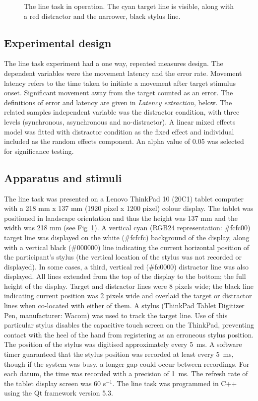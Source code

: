 \documentclass[10pt,letterpaper]{article}
\begin{document}
\begin{figure}[htb!]
\centering
\caption[The line task.]
{The line task in operation. The cyan
  target line is visible, along with a red distractor and the
  narrower, black stylus line.}
\label{linetask}
\end{figure}

\subsection*{Experimental design}
The line task experiment had a one way, repeated measures design. The
dependent variables were the movement latency and the error
rate. Movement latency refers to the time taken to initiate a movement
after target stimulus onset. Significant movement away from the target
counted as an error. The definitions of error and latency are given in
\emph{Latency extraction}, below. The related samples independent
variable was the distractor condition, with three levels (synchronous,
asynchronous and no-distractor). A linear mixed effects model was
fitted with distractor condition as the fixed effect and individual
included as the random effects component. An alpha value of 0.05 was
selected for significance testing.

\subsection*{Apparatus and stimuli}
The line task was presented on a Lenovo ThinkPad 10 (20C1) tablet
computer with a 218 mm x 137 mm (1920 pixel x 1200 pixel) colour
display. The tablet was positioned in landscape orientation and thus
the height was 137 mm and the width was 218 mm (see
Fig~\ref{linetask}). A vertical cyan (RGB24 representation: \#fcfc00)
target line was displayed on the white (\#fcfcfc) background of the
display, along with a vertical black (\#000000) line indicating the
current horizontal position of the participant's stylus (the vertical
location of the stylus was not recorded or displayed). In some cases,
a third, vertical red (\#fc0000) distractor line was also
displayed. All lines extended from the top of the display to the
bottom; the full height of the display. Target and distractor lines
were 8 pixels wide; the black line indicating current position was 2
pixels wide and overlaid the target or distractor lines when
co-located with either of them. A stylus (ThinkPad Tablet Digitizer
Pen, manufacturer: Wacom) was used to track the target line. Use of
this particular stylus disables the capacitive touch screen on the
ThinkPad, preventing contact with the heel of the hand from
registering as an erroneous stylus position. The position of the
stylus was digitised approximately every 5~ms.
%
A software timer guaranteed that the stylus position was recorded at
least every 5~ms, though if the system was busy, a longer gap could
occur between recordings. For each datum, the time was recorded with a
precision of 1~ms.
The refresh rate of the tablet display screen was 60 s$^{-1}$. The line
task was programmed in C++ using the Qt framework version 5.3.
\end{document}
